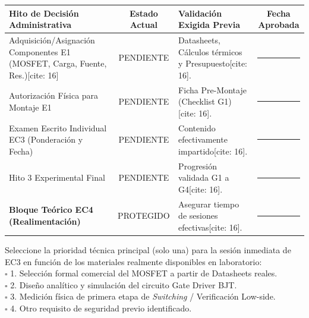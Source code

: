 \documentclass[11pt, a4paper]{article}
\begin{document}
\begin{tabularx}{\textwidth}{|>{\raggedright\arraybackslash}p{5.5cm}|c|>{\raggedright\arraybackslash}X|c|}
\hline
\rowcolor{gray!20}
\textbf{Hito de Decisión Administrativa} & \textbf{Estado Actual} & \textbf{Validación Exigida Previa} & \textbf{Fecha Aprobada} \\ \hline
Adquisición/Asignación Componentes E1 (MOSFET, Carga, Fuente, Res.)[cite: 16] & PENDIENTE & Datasheets, Cálculos térmicos y Presupuesto[cite: 16]. & \rule{2cm}{0.15mm} \\ \hline
Autorización Física para Montaje E1 & PENDIENTE & Ficha Pre-Montaje (Checklist G1)[cite: 16]. & \rule{2cm}{0.15mm} \\ \hline
Examen Escrito Individual EC3 (Ponderación y Fecha) & PENDIENTE & Contenido efectivamente impartido[cite: 16]. & \rule{2cm}{0.15mm} \\ \hline
Hito 3 Experimental Final & PENDIENTE & Progresión validada G1 a G4[cite: 16]. & \rule{2cm}{0.15mm} \\ \hline
\textbf{Bloque Teórico EC4 (Realimentación)} & PROTEGIDO & Asegurar tiempo de sesiones efectivas[cite: 16]. & \rule{2cm}{0.15mm} \\ \hline
\end{tabularx}

\vspace{0.4cm}
\begin{tcolorbox}[colback=yellow!10, colframe=orange, title=\textbf{Triage Docente (Próxima Sesión Efectiva)[cite: 16]}]
    Seleccione la prioridad técnica principal (solo una) para la sesión inmediata de EC3 en función de los materiales realmente disponibles en laboratorio:\\
    $\square$ 1. Selección formal comercial del MOSFET a partir de Datasheets reales.\\
    $\square$ 2. Diseño analítico y simulación del circuito Gate Driver BJT.\\
    $\square$ 3. Medición física de primera etapa de \textit{Switching} / Verificación Low-side.\\
    $\square$ 4. Otro requisito de seguridad previo identificado.
\end{tcolorbox}
\end{document}
